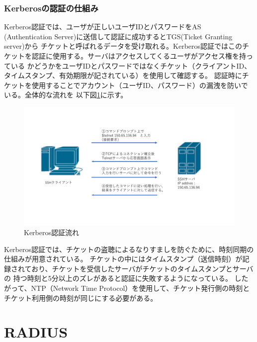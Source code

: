 \documentclass[11pt,a4j,titlepage]{jreport}
\begin{document}
\subsubsection*{Kerberosの認証の仕組み}
Kerberos認証では、ユーザが正しいユーザIDとパスワードをAS\\(Authentication Server)に送信して認証に成功するとTGS(Ticket Granting server)から
チケットと呼ばれるデータを受け取れる。Kerberos認証ではこのチケットを認証に使用する。サーバはアクセスしてくるユーザがアクセス権を持っている
かどうかをユーザIDとパスワードではなくチケット（クライアントID、タイムスタンプ、有効期限が記されている）を使用して確認する。
認証時にチケットを使用することでアカウント（ユーザID、パスワード）の漏洩を防いでいる。全体的な流れを
以下図\ref{KerberosAuthority}に示す。
\begin{figure}[h]
    \begin{flushleft}
        \includegraphics[width=1.0\textwidth, page=12]{graphs/network_archtecture.pdf}
        \caption{Kerberos認証流れ}
        \label{KerberosAuthority}
    \end{flushleft}
\end{figure}\par
Kerberos認証では、チケットの盗聴によるなりすましを防ぐために、時刻同期の仕組みが用意されている。
チケットの中にはタイムスタンプ（送信時刻）が記録されており、チケットを受信したサーバがチケットのタイムスタンプとサーバの
持つ時刻と5分以上のズレがあると認証に失敗するようになっている。
したがって、NTP（Network Time Protocol）を使用して、チケット発行側の時刻とチケット利用側の時刻が同じにする必要がある。
\clearpage

\section{RADIUS}
\end{document}
